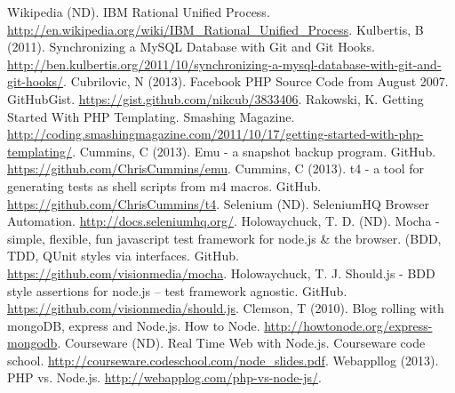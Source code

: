 \newpage
\begin{thebibliography}{9}
 Wikipedia (ND). IBM Rational Unified Process.
  \url{http://en.wikipedia.org/wiki/IBM\_Rational\_Unified\_Process}.
 Kulbertis, B (2011). Synchronizing a MySQL Database with
  Git and Git
  Hooks. \url{http://ben.kulbertis.org/2011/10/synchronizing-a-mysql-database-with-git-and-git-hooks/}.
 Cubrilovic, N (2013). Facebook PHP Source Code from
  August 2007. GitHubGist. \url{https://gist.github.com/nikcub/3833406}.
 Rakowski, K. Getting Started With PHP
  Templating. Smashing
  Magazine. \url{http://coding.smashingmagazine.com/2011/10/17/getting-started-with-php-templating/}.
 Cummins, C (2013). Emu - a snapshot backup
  program. GitHub. \url{https://github.com/ChrisCummins/emu}.
 Cummins, C (2013). t4 - a tool for generating tests as
shell scripts from m4 macros. GitHub. \url{https://github.com/ChrisCummins/t4}.
 Selenium (ND). SeleniumHQ Browser
Automation. \url{http://docs.seleniumhq.org/}.
 Holowaychuck, T. D. (ND). Mocha - simple, flexible, fun
javascript test framework for node.js \& the browser. (BDD, TDD, QUnit styles
via interfaces. GitHub. \url{https://github.com/visionmedia/mocha}.
 Holowaychuck, T. J. Should.js - BDD style assertions
for node.js -- test framework
agnostic. GitHub. \url{https://github.com/visionmedia/should.js}.
 Clemson, T (2010). Blog rolling with mongoDB, express and
Node.js. How to Node. \url{http://howtonode.org/express-mongodb}.
 Courseware (ND). Real Time Web with Node.js. Courseware
code school. \url{http://courseware.codeschool.com/node_slides.pdf}.
 Webappllog (2013). PHP
vs. Node.js. \url{http://webapplog.com/php-vs-node-js/}.
\end{thebibliography}
